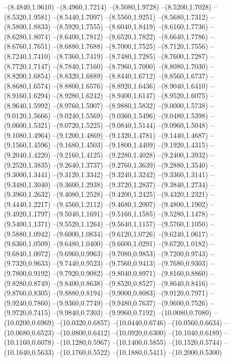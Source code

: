{\begin{scope}
--(8.4840,1.9610)
--(8.4960,1.7214)
--(8.5080,1.9728)
--(8.5200,1.7028)
--(8.5320,1.9581)
--(8.5440,1.7097)
--(8.5560,1.9251)
--(8.5680,1.7312)
--(8.5800,1.8833)
--(8.5920,1.7555)
--(8.6040,1.8419)
--(8.6160,1.7736)
--(8.6280,1.8074)
--(8.6400,1.7812)
--(8.6520,1.7822)
--(8.6640,1.7786)
--(8.6760,1.7651)
--(8.6880,1.7688)
--(8.7000,1.7525)
--(8.7120,1.7556)
--(8.7240,1.7410)
--(8.7360,1.7419)
--(8.7480,1.7285)
--(8.7600,1.7287)
--(8.7720,1.7147)
--(8.7840,1.7160)
--(8.7960,1.7000)
--(8.8080,1.7030)
--(8.8200,1.6854)
--(8.8320,1.6889)
--(8.8440,1.6712)
--(8.8560,1.6737)
--(8.8680,1.6574)
--(8.8800,1.6576)
--(8.8920,1.6436)
--(8.9040,1.6410)
--(8.9160,1.6294)
--(8.9280,1.6242)
--(8.9400,1.6147)
--(8.9520,1.6075)
--(8.9640,1.5992)
--(8.9760,1.5907)
--(8.9880,1.5832)
--(9.0000,1.5738)
--(9.0120,1.5666)
--(9.0240,1.5569)
--(9.0360,1.5496)
--(9.0480,1.5398)
--(9.0600,1.5321)
--(9.0720,1.5225)
--(9.0840,1.5144)
--(9.0960,1.5048)
--(9.1080,1.4964)
--(9.1200,1.4869)
--(9.1320,1.4781)
--(9.1440,1.4687)
--(9.1560,1.4596)
--(9.1680,1.4503)
--(9.1800,1.4409)
--(9.1920,1.4315)
--(9.2040,1.4220)
--(9.2160,1.4125)
--(9.2280,1.4028)
--(9.2400,1.3932)
--(9.2520,1.3835)
--(9.2640,1.3737)
--(9.2760,1.3639)
--(9.2880,1.3540)
--(9.3000,1.3441)
--(9.3120,1.3342)
--(9.3240,1.3242)
--(9.3360,1.3141)
--(9.3480,1.3040)
--(9.3600,1.2938)
--(9.3720,1.2837)
--(9.3840,1.2734)
--(9.3960,1.2632)
--(9.4080,1.2528)
--(9.4200,1.2425)
--(9.4320,1.2321)
--(9.4440,1.2217)
--(9.4560,1.2112)
--(9.4680,1.2007)
--(9.4800,1.1902)
--(9.4920,1.1797)
--(9.5040,1.1691)
--(9.5160,1.1585)
--(9.5280,1.1478)
--(9.5400,1.1371)
--(9.5520,1.1264)
--(9.5640,1.1157)
--(9.5760,1.1050)
--(9.5880,1.0942)
--(9.6000,1.0834)
--(9.6120,1.0726)
--(9.6240,1.0617)
--(9.6360,1.0509)
--(9.6480,1.0400)
--(9.6600,1.0291)
--(9.6720,1.0182)
--(9.6840,1.0072)
--(9.6960,0.9963)
--(9.7080,0.9853)
--(9.7200,0.9743)
--(9.7320,0.9633)
--(9.7440,0.9523)
--(9.7560,0.9413)
--(9.7680,0.9303)
--(9.7800,0.9192)
--(9.7920,0.9082)
--(9.8040,0.8971)
--(9.8160,0.8860)
--(9.8280,0.8749)
--(9.8400,0.8638)
--(9.8520,0.8527)
--(9.8640,0.8416)
--(9.8760,0.8305)
--(9.8880,0.8194)
--(9.9000,0.8083)
--(9.9120,0.7971)
--(9.9240,0.7860)
--(9.9360,0.7749)
--(9.9480,0.7637)
--(9.9600,0.7526)
--(9.9720,0.7415)
--(9.9840,0.7303)
--(9.9960,0.7192)
--(10.0080,0.7080)
--(10.0200,0.6969)
--(10.0320,0.6857)
--(10.0440,0.6746)
--(10.0560,0.6634)
--(10.0680,0.6523)
--(10.0800,0.6412)
--(10.0920,0.6300)
--(10.1040,0.6189)
--(10.1160,0.6078)
--(10.1280,0.5967)
--(10.1400,0.5855)
--(10.1520,0.5744)
--(10.1640,0.5633)
--(10.1760,0.5522)
--(10.1880,0.5411)
--(10.2000,0.5300)

\end{scope}}
